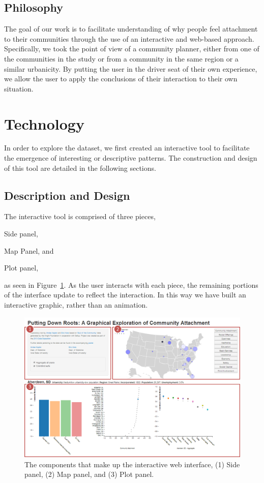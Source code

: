 \documentclass[11pt]{article}\usepackage{knitr}
\begin{document}
\subsection*{Philosophy}
The goal of our work is to facilitate understanding of why people feel attachment to their communities through the use of an interactive and web-based approach. Specifically, we took the point of view of a community planner, either from one of the communities in the study or from a community in the same region or a similar urbanicity. By putting the user in the driver seat of their own experience, we allow the user to apply the conclusions of their interaction to their own situation.


\section*{Technology}

In order to explore the dataset, we first created an interactive tool to facilitate the emergence of interesting or descriptive patterns. The construction and design of this tool are detailed in the following sections.

\subsection*{Description and Design}
The interactive tool is comprised of three pieces, \begin{inparaenum}[(1)]
\item Side panel, 
\item Map Panel, and
\item Plot panel,
\end{inparaenum}
as seen in Figure~\ref{fig:tool}.
As the user interacts with each piece, the remaining portions of the interface update to reflect the interaction. In this way we have built an interactive graphic, rather than an animation.

\begin{figure}[H]
\centering
\includegraphics[width=\textwidth]{images/tool.png}
\caption{\label{fig:tool} The components that make up the interactive web interface, (1) Side panel, (2) Map panel, and (3) Plot panel.}
\end{figure}
\end{document}
